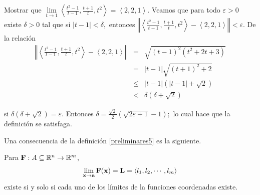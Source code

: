 \begin{parrafoitemize}
\item Mostrar que $\lim\limits_{t\rightarrow 1}\left\langle \frac{t^{2}-1}{t-1},\frac{t+1}{t},t^{2}\right\rangle =\left\langle 2,2,1\right\rangle $. Veamos que para todo $\varepsilon >0$ existe
  $\delta >0$ tal que si $\left\vert t-1\right\vert <\delta, $
  entonces $\left\Vert \left\langle \frac{t^{2}-1}{t-1},\frac{t+1}{t},t^{2}\right\rangle -\left\langle 2,2,1\right\rangle \right\Vert<\varepsilon $.
  De la relación
  \begin{eqnarray*}
    \left\Vert \left\langle \frac{t^{2}-1}{t-1},\frac{t+1}{t}%
    ,t^{2}\right\rangle -\left\langle 2,2,1\right\rangle \right\Vert  &=&
    \sqrt{\left( t-1\right) ^{2}\left( t^{2}+2t+3\right) } \\
    &=&\left\vert t-1\right\vert \sqrt{\left( t+1\right) ^{2}+2} \\
    &\leq& \left\vert t-1\right\vert \left( \left\vert t-1\right\vert +\sqrt{2}
    \right)  \\ &<& \delta \left( \delta +\sqrt{2}\right)
  \end{eqnarray*}

  si $\delta \left( \delta +\sqrt{2}\right) =\varepsilon $. Entonces
  $\delta =\frac{\sqrt{2}}{2}\left( \sqrt{2\varepsilon +1}-1\right) ;$ lo cual hace que
  la definición se satisfaga.
\end{parrafoitemize}
Una consecuencia de la definición \ref{preliminares5} es la siguiente.
\begin{teorema}\label{preliminares3}
  Para  $\mathbf{F}: A \subseteq\mathbb{R}^n \to  \mathbb{R}^m$,
  \[ \lim_{{\bf x}\to {\bf a}}\mathbf{F}({\bf x})=\mathbf{L}=\langle l_{1},l_{2},\cdots ,l_{m}\rangle \] existe si y solo si
  cada uno de los límites de la funciones coordenadas existe.
\end{teorema}

